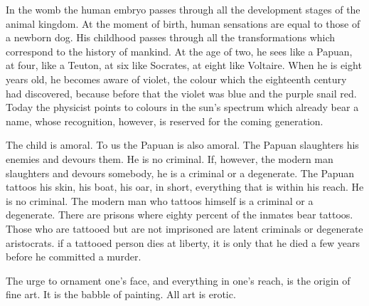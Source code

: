 \documentclass[a4paper]{article}
\begin{document}
In the womb the human embryo passes through all the development stages of the animal kingdom. At the moment of birth, human sensations are equal to those of a newborn dog. His childhood passes through all the transformations which correspond to the history of mankind. At the age of two, he sees like a Papuan, at four, like a Teuton, at six like Socrates, at eight like Voltaire. When he is eight years old, he becomes aware of violet, the colour which the eighteenth century had discovered, because before that the violet was blue and the purple snail red. Today the physicist points to colours in the sun’s spectrum which already bear a name, whose recognition, however, is reserved for the coming generation.

The child is amoral. To us the Papuan is also amoral. The Papuan slaughters his enemies and devours them. He is no criminal. If, however, the modern man slaughters and devours somebody, he is a criminal or a degenerate. The Papuan tattoos his skin, his boat, his oar, in short, everything that is within his reach. He is no criminal. The modern man who tattoos himself is a criminal or a degenerate. There are prisons where eighty percent of the inmates bear tattoos. Those who are tattooed but are not imprisoned are latent criminals or degenerate aristocrats. if a tattooed person dies at liberty, it is only that he died a few years before he committed a murder.

The urge to ornament one’s face, and everything in one’s reach, is the origin of fine art. It is the babble of painting. All art is erotic.
\end{document}
